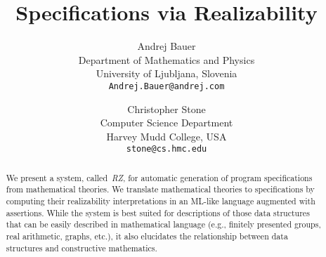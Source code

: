 \documentclass{article}
\begin{document}
\twocolumn

\title{Specifications via Realizability}

\author{
  Andrej Bauer\\
  {\small Department of Mathematics and Physics}\\
  {\small University of Ljubljana, Slovenia}\\
  {\small \texttt{Andrej.Bauer@andrej.com}}
  \and
  Christopher Stone\\
  {\small Computer Science Department}\\
  {\small Harvey Mudd College, USA}\\
  {\small \texttt{stone@cs.hmc.edu}}
}

\maketitle

\begin{abstract}
We present a system, called~\emph{RZ}, for automatic generation of
program specifications from mathematical theories. We translate
mathematical theories to specifications by computing their
realizability interpretations in an ML-like language augmented with
assertions. While the system is best suited for descriptions of those
data structures that can be easily described in mathematical
language (e.g., finitely presented groups, real
arithmetic, graphs, etc.), it also elucidates the
relationship between data structures and constructive mathematics.
\end{abstract}

















\end{document}
